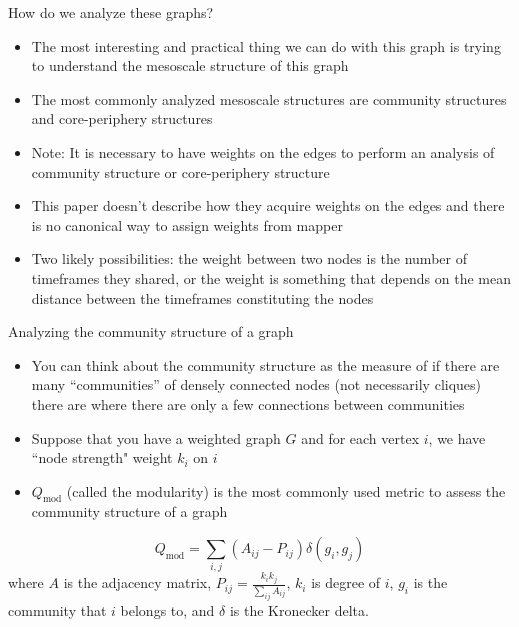 \documentclass{beamer}
\begin{document}
\begin{frame}{How do we analyze these graphs?}
    \begin{itemize}
        \item The most interesting and practical thing we can do with this graph is trying to understand the mesoscale structure of this graph \pause
        \item The most commonly analyzed mesoscale structures are community structures and core-periphery structures \pause
        \item Note: It is necessary to have weights on the edges to perform an analysis of community structure or core-periphery structure
        \item This paper doesn't describe how they acquire weights on the edges and there is no canonical way to assign weights from mapper \pause
        \item Two likely possibilities: the weight between two nodes is the number of timeframes they shared, or the weight is something that depends on the mean distance between the timeframes constituting the nodes
    \end{itemize}
\end{frame}

\begin{frame}{Analyzing the community structure of a graph}
    \begin{itemize}
        \item You can think about the community structure as the measure of if there are many ``communities'' of densely connected nodes (not necessarily cliques) there are where there are only a few connections between communities \pause
        \item Suppose that you have a weighted graph $G$ and for each vertex $i$, we have ``node strength" weight $k_i$ on $i$ \pause
        \item $Q_{\mathrm{mod}}$ (called the modularity) is the most commonly used metric to assess the community structure of a graph\cite{community} \pause
    \end{itemize}
    \[Q_{\mathrm{mod}} = \sum_{i,j} \left(A_{ij} - P_{ij}\right)\delta(g_i, g_j)\]
    where $A$ is the adjacency matrix, $P_{ij} = \frac{k_i k_j}{\sum_{ij}A_{ij}}$, $k_i$ is degree of $i$, $g_i$ is the community that $i$ belongs to, and $\delta$ is the Kronecker delta.
\end{frame}
\end{document}
